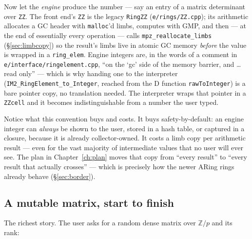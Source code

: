 \documentclass[11pt,oneside]{report}
\newcommand{\code}[1]{\textcolor{m2code}{\texttt{#1}}}
\newcommand{\file}[1]{\textcolor{m2file}{\texttt{#1}}}
\begin{document}
Now let the \emph{engine} produce the number --- say an entry of a matrix
determinant over \code{ZZ}. The front end's \code{ZZ} is the legacy
\code{RingZZ} (\file{e/rings/ZZ.cpp}); its arithmetic allocates a GC header
with \code{malloc}'d limbs, computes with GMP, and then --- at the end of
essentially every operation --- calls \code{mpz\_reallocate\_limbs}
(\S\ref{sec:limbcopy}) so the result's limbs live in atomic GC memory
\emph{before} the value is wrapped in a \code{ring\_elem}. Engine integers
are, in the words of a comment in \file{e/interface/ringelement.cpp}, ``on
the `gc' side of the memory barrier, and \ldots{} read only'' --- which is
why handing one to the interpreter (\code{IM2\_RingElement\_to\_Integer},
reached from the D function \code{rawToInteger}) is a bare pointer copy, no
translation needed. The interpreter wraps that pointer in a \code{ZZcell}
and it becomes indistinguishable from a number the user typed.

Notice what this convention buys and costs. It buys safety-by-default: an
engine integer can \emph{always} be shown to the user, stored in a hash
table, or captured in a closure, because it is already collector-owned. It
costs a limb copy per arithmetic result --- even for the vast majority of
intermediate values that no user will ever see. The plan in
Chapter~\ref{ch:plan} moves that copy from ``every result'' to ``every
result that actually crosses'' --- which is precisely how the newer ARing
rings already behave (\S\ref{sec:border}).

\subsection{A mutable matrix, start to finish}

The richest story. The user asks for a random dense matrix over
$\mathbb{Z}/p$ and its rank:
\end{document}
